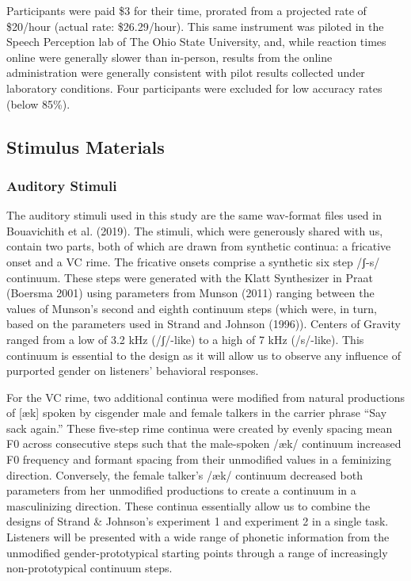 \documentclass[
  letterpaper,
  DIV=11,
  numbers=noendperiod]{scrartcl}
\begin{document}
Participants were paid \$3 for their time, prorated from a projected
rate of \$20/hour (actual rate: \$26.29/hour). This same instrument was
piloted in the Speech Perception lab of The Ohio State University, and,
while reaction times online were generally slower than in-person,
results from the online administration were generally consistent with
pilot results collected under laboratory conditions. Four participants
were excluded for low accuracy rates (below 85\%).

\subsection{Stimulus Materials}\label{sec-stimuli}

\subsubsection{Auditory Stimuli}\label{sec-stimuli-auditory}

The auditory stimuli used in this study are the same wav-format files
used in Bouavichith et al. (2019). The stimuli, which were generously
shared with us, contain two parts, both of which are drawn from
synthetic continua: a fricative onset and a VC rime. The fricative
onsets comprise a synthetic six step /ʃ-s/ continuum. These steps were
generated with the Klatt Synthesizer in Praat (Boersma 2001) using
parameters from Munson (2011) ranging between the values of Munson's
second and eighth continuum steps (which were, in turn, based on the
parameters used in Strand and Johnson (1996)). Centers of Gravity ranged
from a low of 3.2 kHz (/ʃ/-like) to a high of 7 kHz (/s/-like). This
continuum is essential to the design as it will allow us to observe any
influence of purported gender on listeners' behavioral responses.

For the VC rime, two additional continua were modified from natural
productions of {[}æk{]} spoken by cisgender male and female talkers in
the carrier phrase ``Say sack again.'' These five-step rime continua
were created by evenly spacing mean F0 across consecutive steps such
that the male-spoken /æk/ continuum increased F0 frequency and formant
spacing from their unmodified values in a feminizing direction.
Conversely, the female talker's /æk/ continuum decreased both parameters
from her unmodified productions to create a continuum in a masculinizing
direction. These continua essentially allow us to combine the designs of
Strand \& Johnson's experiment 1 and experiment 2 in a single task.
Listeners will be presented with a wide range of phonetic information
from the unmodified gender-prototypical starting points through a range
of increasingly non-prototypical continuum steps.
\end{document}
